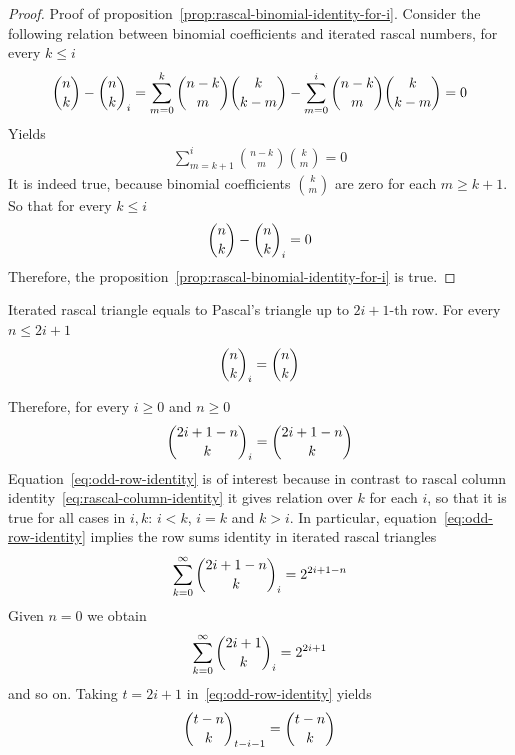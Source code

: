 \begin{proof}
    Proof of proposition~\eqref{prop:rascal-binomial-identity-for-i}.
    Consider the following relation between binomial coefficients and iterated rascal numbers,
    for every $k \leq i$
    \begin{align*}
        \binom{n}{k} - \binom{n}{k}_{i} = \sum_{m=0}^{k} \binom{n-k}{m} \binom{k}{k-m} - \sum_{m=0}^{i} \binom{n-k}{m} \binom{k}{k-m} = 0
    \end{align*}
    Yields
    \begin{align*}
        \sum_{m=k+1}^{i} \binom{n-k}{m} \binom{k}{m} = 0
    \end{align*}
    It is indeed true, because binomial coefficients $\binom{k}{m}$ are zero for each $m \geq k+1$.
    So that for every $k \leq i$
    \begin{align*}
        \binom{n}{k} - \binom{n}{k}_{i} = 0
    \end{align*}
    Therefore, the proposition~\eqref{prop:rascal-binomial-identity-for-i} is true.
\end{proof}
\begin{proposition}
    \label{prop:odd-row-proposition}
    Iterated rascal triangle equals to Pascal's triangle up to $2i+1$-th row.
    For every $n \leq 2i+1$
    \begin{align*}
        \binom{n}{k}_{i} = \binom{n}{k}
    \end{align*}
\end{proposition}
Therefore, for every $i \geq 0$ and $n \geq 0$
\begin{equation}
    \binom{2i+1-n}{k}_{i} = \binom{2i+1-n}{k}
    \label{eq:odd-row-identity}
\end{equation}
Equation~\eqref{eq:odd-row-identity} is of interest because in contrast to rascal
column identity~\eqref{eq:rascal-column-identity} it gives relation over $k$ for each $i$,
so that it is true for all cases in $i,k$: $i < k$, $i=k$ and $k >i$.
In particular, equation~\eqref{eq:odd-row-identity} implies the row sums identity in iterated rascal triangles
\begin{align*}
    \sum_{k=0}^{\infty} \binom{2i+1-n}{k}_{i} = 2^{2i+1-n}
\end{align*}
Given $n=0$ we obtain
\begin{align*}
    \sum_{k=0}^{\infty} \binom{2i+1}{k}_{i} = 2^{2i+1}
\end{align*}
and so on.
Taking $t=2i+1$ in~\eqref{eq:odd-row-identity} yields
\begin{align*}
    \binom{t-n}{k}_{t-i-1}= \binom{t-n}{k}
\end{align*}
